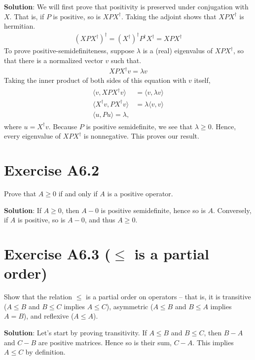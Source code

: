 \documentclass{book}
\newcommand{\innerprod}[2]{\langle#1,#2\rangle}
\begin{document}
    \textbf{Solution}: We will first prove that positivity is preserved under conjugation with $X$. That is, if $P$ is positive, so is $XPX^\dagger$. Taking the adjoint shows that $XPX^\dagger$ is hermitian.
    \begin{align}
        (XPX^\dagger)^\dagger = (X^\dagger)^\dagger P^\dagger X^\dagger = XPX^\dagger
    \end{align}
    To prove positive-semidefiniteness, suppose $\lambda$ is a (real) eigenvalus of $XPX^\dagger$, so that there is a normalized vector $v$ such that.
    \begin{align}
        XPX^\dagger v = \lambda v
    \end{align}
    Taking the inner product of both sides of this equation with $v$ itself,
    \begin{align}
    \begin{aligned}
        \innerprod{v}{XPX^\dagger v} &= \innerprod{v}{\lambda v} \\
        \innerprod{X^\dagger v}{PX^\dagger v} &= \lambda \innerprod{v}{v} \\
        \innerprod{u}{Pu} = \lambda,
    \end{aligned}
    \end{align}
    where $u = X^\dagger v$. Because $P$ is positive semidefinite, we see that $\lambda \geq 0$. Hence, every eigenvalue of $XPX^\dagger$ is nonnegative. This proves our result.  

\section*{Exercise A6.2}
    Prove that $A\geq 0$ if and only if $A$ is a positive operator.
    
    \textbf{Solution}: If $A\geq 0$, then $A - 0$ is positive semidefinite, hence so is $A$. Conversely, if $A$ is positive, so is $A-0$, and thus $A \geq 0$.
    
\section*{Exercise A6.3 ($\leq$ is a partial order)}
    Show that the relation $\leq$ is a partial order on operators -- that is, it is transitive ($A\leq B$ and $B \leq C$ implies $A \leq C$), asymmetric ($A \leq B$ and $B \leq A$ implies $A = B$), and reflexive ($A\leq A$).

    \textbf{Solution}: Let's start by proving transitivity. If $A\leq B$ and $B\leq C$, then $B-A$ and $C - B$ are positive matrices. Hence so is their sum, $C-A$. This implies $A \leq C$ by definition.
    
\end{document}
